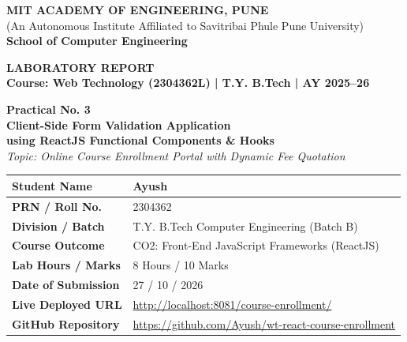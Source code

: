 \documentclass[11pt,a4paper]{article}
\begin{document}
\begin{titlepage}
    \centering
    \vspace*{0.5cm}
    
    {\Large \textbf{MIT ACADEMY OF ENGINEERING, PUNE}}\\[0.2cm]
    {\large (An Autonomous Institute Affiliated to Savitribai Phule Pune University)}\\[0.2cm]
    {\textbf{School of Computer Engineering}}\\[1.2cm]
    
    \begin{tcolorbox}[colback=collegeblue,colframe=collegeblue,arc=3mm,width=\textwidth,halign=center]
        \vspace{0.3cm}
        {\LARGE \color{white} \textbf{LABORATORY REPORT}}\\[0.3cm]
        {\large \color{accentamber} \textbf{Course: Web Technology (2304362L) | T.Y. B.Tech | AY 2025--26}}
        \vspace{0.3cm}
    \end{tcolorbox}
    
    \vspace{1.2cm}
    
    {\LARGE \textbf{Practical No. 3}}\\[0.3cm]
    {\huge \bfseries \color{collegeblue} Client-Side Form Validation Application}\\[0.2cm]
    {\Large \textbf{using ReactJS Functional Components \& Hooks}}\\[0.4cm]
    {\textit{Topic: Online Course Enrollment Portal with Dynamic Fee Quotation}}\\[1.5cm]

    \begin{minipage}{0.85\textwidth}
        \renewcommand{\arraystretch}{1.5}
        \begin{tabular}{|p{4.2cm}|p{8.5cm}|}
            \hline
            \textbf{Student Name} & Ayush \\ \hline
            \textbf{PRN / Roll No.} & 2304362 \\ \hline
            \textbf{Division / Batch} & T.Y. B.Tech Computer Engineering (Batch B) \\ \hline
            \textbf{Course Outcome} & CO2: Front-End JavaScript Frameworks (ReactJS) \\ \hline
            \textbf{Lab Hours / Marks} & 8 Hours / 10 Marks \\ \hline
            \textbf{Date of Submission} & 27 / 10 / 2026 \\ \hline
            \textbf{Live Deployed URL} & \url{http://localhost:8081/course-enrollment/} \\ \hline
            \textbf{GitHub Repository} & \url{https://github.com/Ayush/wt-react-course-enrollment} \\ \hline
        \end{tabular}
    \end{minipage}


\end{titlepage}
\end{document}
